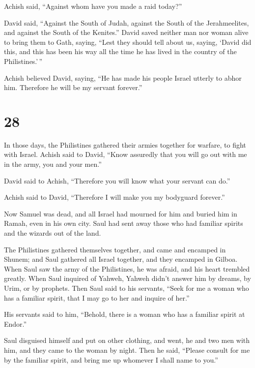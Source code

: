  Achish said, ``Against whom have you made a raid today?''

David said, ``Against the South of Judah, against the South of the
Jerahmeelites, and against the South of the Kenites.'' 
David saved neither man nor woman alive to bring them to Gath, saying,
``Lest they should tell about us, saying, `David did this, and this has
been his way all the time he has lived in the country of the
Philistines.'\,''

 Achish believed David, saying, ``He has made his people
Israel utterly to abhor him. Therefore he will be my servant forever.''

\hypertarget{section-27}{%
\section{28}\label{section-27}}

 In those days, the Philistines gathered their armies
together for warfare, to fight with Israel. Achish said to David, ``Know
assuredly that you will go out with me in the army, you and your men.''

 David said to Achish, ``Therefore you will know what your
servant can do.''

Achish said to David, ``Therefore I will make you my bodyguard
forever.''

 Now Samuel was dead, and all Israel had mourned for him and
buried him in Ramah, even in his own city. Saul had sent away those who
had familiar spirits and the wizards out of the land.

 The Philistines gathered themselves together, and came and
encamped in Shunem; and Saul gathered all Israel together, and they
encamped in Gilboa.  When Saul saw the army of the
Philistines, he was afraid, and his heart trembled greatly. 
When Saul inquired of Yahweh, Yahweh didn't answer him by dreams, by
Urim, or by prophets.  Then Saul said to his servants,
``Seek for me a woman who has a familiar spirit, that I may go to her
and inquire of her.''

His servants said to him, ``Behold, there is a woman who has a familiar
spirit at Endor.''

 Saul disguised himself and put on other clothing, and went,
he and two men with him, and they came to the woman by night. Then he
said, ``Please consult for me by the familiar spirit, and bring me up
whomever I shall name to you.''

